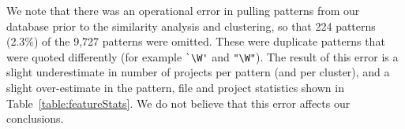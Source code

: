 

We note that there was an operational error in pulling patterns from our database prior to the similarity analysis and clustering, so that 224 patterns (2.3\%) of the 9,727 patterns were omitted. These were duplicate patterns that were quoted differently (for example \verb!`\W'! and \verb!"\W"!).  The result of this error is a slight underestimate in number of projects per pattern (and per cluster), and a slight over-estimate in the pattern, file and project statistics shown in Table~\ref{table:featureStats}.  We do not believe that this error affects our conclusions.


